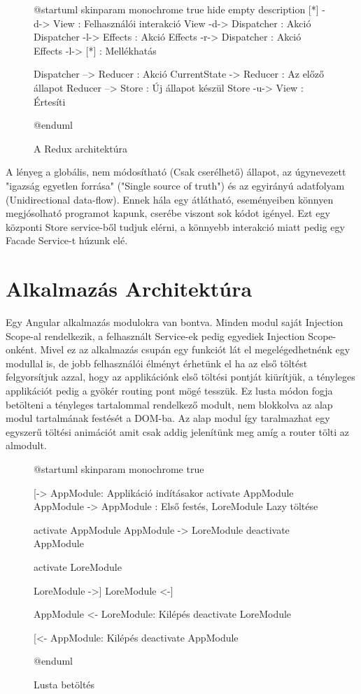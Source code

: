 \begin{figure}[h!]
	\centering
	\begin{plantuml}
		@startuml
		skinparam monochrome true
		hide empty description
		[*] -d-> View : Felhasználói interakció
		View -d-> Dispatcher : Akció
		Dispatcher -l-> Effects : Akció
		Effects -r-> Dispatcher : Akció
		Effects -l-> [*] : Mellékhatás

		Dispatcher --> Reducer : Akció
		CurrentState -> Reducer : Az előző állapot
		Reducer --> Store : Új állapot készül
		Store -u-> View : Értesíti

		@enduml
	\end{plantuml}
	\caption{A Redux architektúra}
	\label{fig:redux-architecture}
\end{figure}

A lényeg a globális, nem módosítható (Csak cserélhető) állapot, az úgynevezett "igazság egyetlen forrása" ("Single source of truth") és az egyirányú adatfolyam (Unidirectional data-flow). Ennek hála egy átlátható, eseményeiben könnyen megjósolható programot kapunk, cserébe viszont sok kódot igényel.
Ezt egy központi Store service-ből tudjuk elérni, a könnyebb interakció miatt pedig egy Facade\cite{Facade} Service-t húzunk elé.

\section{Alkalmazás Architektúra}

Egy Angular alkalmazás modulokra van bontva. Minden modul saját Injection Scope-al rendelkezik, a felhasznált Service-ek pedig egyediek Injection Scope-onként. Mivel ez az alkalmazás csupán egy funkciót lát el megelégedhetnénk egy modullal is, de jobb felhasználói élményt érhetünk el ha az első töltést felgyorsítjuk azzal, hogy az applikációnk első töltési pontját kiürítjük, a tényleges applikációt pedig a gyökér routing pont mögé tesszük. Ez lusta módon \cite{LazyLoad} fogja betölteni a tényleges tartalommal rendelkező modult, nem blokkolva az alap modul tartalmának festését a DOM-ba. Az alap modul így taralmazhat egy egyszerű töltési animációt amit csak addig jelenítünk meg amíg a router tölti az almodult.

\begin{figure}[h!]
	\centering
	\begin{plantuml}
		@startuml
		skinparam monochrome true

		[-> AppModule: Applikáció indításakor
		activate AppModule
		AppModule -> AppModule : Első festés, LoreModule Lazy töltése

		activate  AppModule
		AppModule -> LoreModule
		deactivate AppModule

		activate LoreModule

		LoreModule ->]
		LoreModule <-]


		AppModule <- LoreModule: Kilépés
		deactivate LoreModule

		[<- AppModule: Kilépés
		deactivate AppModule

		@enduml


	\end{plantuml}
	\caption{Lusta betöltés}
	\label{fig:lazy-loading}
\end{figure}


